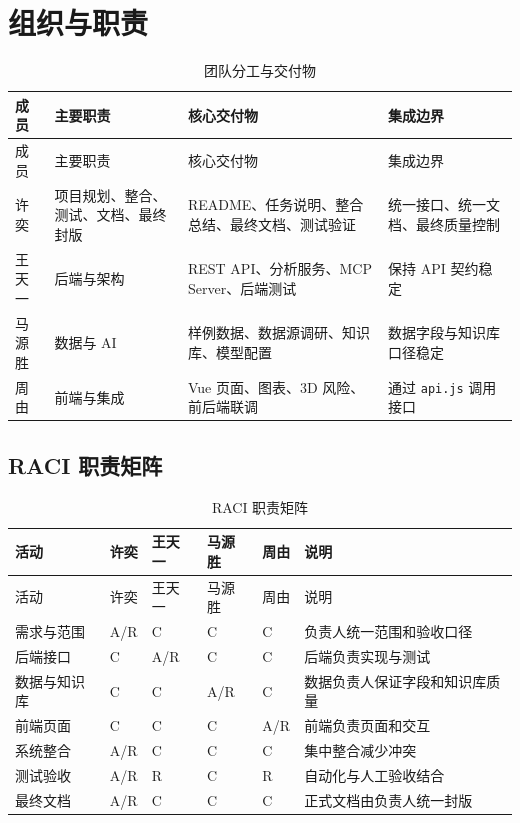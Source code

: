 \documentclass[12pt,a4paper]{ctexart}
\newcommand{\code}[1]{{\footnotesize\nolinkurl{#1}}}
\begin{document}
\section{组织与职责}
\begin{longtable}{p{2.5cm}p{4.2cm}p{4.2cm}p{3.4cm}}
\caption{团队分工与交付物}\\
\toprule
成员 & 主要职责 & 核心交付物 & 集成边界 \\
\midrule
\endfirsthead
\toprule
成员 & 主要职责 & 核心交付物 & 集成边界 \\
\midrule
\endhead
许奕 & 项目规划、整合、测试、文档、最终封版 & README、任务说明、整合总结、最终文档、测试验证 & 统一接口、统一文档、最终质量控制 \\
王天一 & 后端与架构 & REST API、分析服务、MCP Server、后端测试 & 保持 API 契约稳定 \\
马源胜 & 数据与 AI & 样例数据、数据源调研、知识库、模型配置 & 数据字段与知识库口径稳定 \\
周由 & 前端与集成 & Vue 页面、图表、3D 风险、前后端联调 & 通过 \code{api.js} 调用接口 \\
\bottomrule
\end{longtable}

\subsection{RACI 职责矩阵}
\begin{longtable}{L{3.4cm}C{1.7cm}C{1.7cm}C{1.7cm}C{1.7cm}L{3.2cm}}
\caption{RACI 职责矩阵}\\
\toprule
活动 & 许奕 & 王天一 & 马源胜 & 周由 & 说明 \\
\midrule
\endfirsthead
\toprule
活动 & 许奕 & 王天一 & 马源胜 & 周由 & 说明 \\
\midrule
\endhead
需求与范围 & A/R & C & C & C & 负责人统一范围和验收口径 \\
后端接口 & C & A/R & C & C & 后端负责实现与测试 \\
数据与知识库 & C & C & A/R & C & 数据负责人保证字段和知识库质量 \\
前端页面 & C & C & C & A/R & 前端负责页面和交互 \\
系统整合 & A/R & C & C & C & 集中整合减少冲突 \\
测试验收 & A/R & R & C & R & 自动化与人工验收结合 \\
最终文档 & A/R & C & C & C & 正式文档由负责人统一封版 \\
\bottomrule
\end{longtable}
\end{document}
